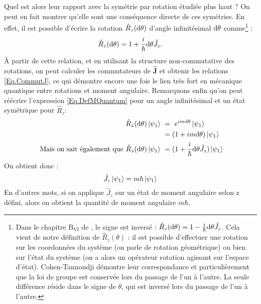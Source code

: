 Quel est alors leur rapport avec la symétrie par rotation étudiée plus haut ? On peut en fait montrer qu'elle sont une conséquence directe de ces symétries. En effet, il est possible d'écrire la rotation $\hat{R}_z(\mathrm{d}\theta)$ d'angle infinitésimal $\mathrm{d}\theta$ comme\footnote{Dans le chapitre $\text{B}_{\text{VI}}$ de , le signe est inversé : $\hat{R}_z(\mathrm{d}\theta) = 1-\frac{i}{\hbar}\mathrm{d} \theta \hat{J}_z$. Cela vient de notre définition de $\hat{R}_z(\theta)$ : il est possible d'effectuer une rotation sur les coordonnées du système (on parle de rotation géométrique) ou bien sur l'état du système (on a alors un opérateur rotation agissant sur l'espace d'état). Cohen-Tannoudji démontre leur correspondance et particulièrement que la loi de groupe est conservée lors du passage de l'un à l'autre. La seule différence réside dans le signe de $\theta$, qui est inversé lors du passage de l'un à l'autre.} :
\begin{equation*}
\hat{R}_z(\mathrm{d}\theta) = 1+\frac{i}{\hbar}\mathrm{d} \theta \hat{J}_z.
\end{equation*}
\`A partir de cette relation, et en utilisant la structure non-commutative des rotations, on peut calculer les commutateurs de $\bm{\hat{J}}$ et obtenir les relations \ref{Eq.CommutJ}, ce qui démontre encore une fois le lien très fort en mécanique quantique entre rotations et moment angulaire. Remarquons enfin qu'on peut réécrire l'expression \ref{Eq.DefMQuantum} pour un angle infinitésimal et un état symétrique pour $\hat{R}_z$:
\begin{align*}
\hat{R}_z(\mathrm{d}\theta)\ket{\psi_1}~&=~e^{im\mathrm{d}\theta}\ket{\psi_1}\\
~&=(1+im\mathrm{d}\theta)\ket{\psi_1}\\
\mbox{ Mais on sait également que }\hat{R}_z(\mathrm{d}\theta)\ket{\psi_1}~&=(1+\frac{i}{\hbar}\mathrm{d} \theta \hat{J}_z)\ket{\psi_1}
\end{align*}
On obtient donc : 
\begin{equation*}
\hat{J}_z\ket{\psi_1} = m\hbar\ket{\psi_1}
\end{equation*}
En d'autres mots, si on applique $\hat{J}_z$ sur un état de moment angulaire selon z défini, alors on obtient la quantité de moment angulaire $m\hbar$. 